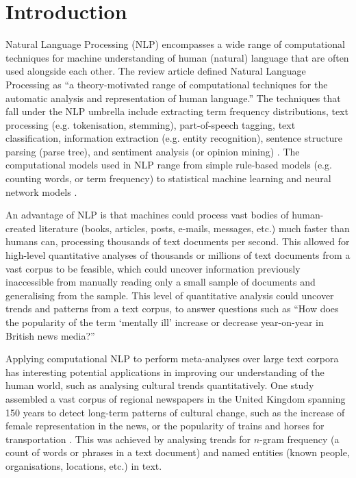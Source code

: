 \documentclass{report}
\begin{document}
\chapter{Introduction} \label{Introduction} %


Natural Language Processing (NLP) encompasses a wide range of computational techniques for machine understanding of human (natural) language that are often used alongside each other.
The review article \cite{cambria2014jumping} defined Natural Language Processing as ``a theory-motivated range of computational techniques for the automatic analysis and representation of human language.''
The techniques that fall under the NLP umbrella include extracting term frequency distributions, text processing (e.g. tokenisation, stemming), part-of-speech tagging, text classification, information extraction (e.g. entity recognition), sentence structure parsing (parse tree), and sentiment analysis (or opinion mining) \cite{Nltk, liu2012sentiment}.
The computational models used in NLP range from simple rule-based models (e.g. counting words, or term frequency) to statistical machine learning and neural network models \cite{awesome-sentiment-analysis}. 

An advantage of NLP is that machines could process vast bodies of human-created literature (books, articles, posts, e-mails, messages, etc.) much faster than humans can, processing thousands of text documents per second. 
This allowed for high-level quantitative analyses of thousands or millions of text documents from a vast corpus to be feasible, which could uncover information previously inaccessible from manually reading only a small sample of documents and generalising from the sample.
This level of quantitative analysis could uncover trends and patterns from a text corpus, to answer questions such as ``How does the popularity of the term `mentally ill' increase or decrease year-on-year in British news media?'' 

Applying computational NLP to perform meta-analyses over large text corpora has interesting potential applications in improving our understanding of the human world, such as analysing cultural trends quantitatively.
One study assembled a vast corpus of regional newspapers in the United Kingdom spanning 150 years to detect long-term patterns of cultural change, such as the increase of female representation in the news, or the popularity of trains and horses for transportation \cite{lansdall2017content}. 
This was achieved by analysing trends for $n$-gram frequency (a count of words or phrases in a text document) and named entities (known people, organisations, locations, etc.) in text.
\end{document}
